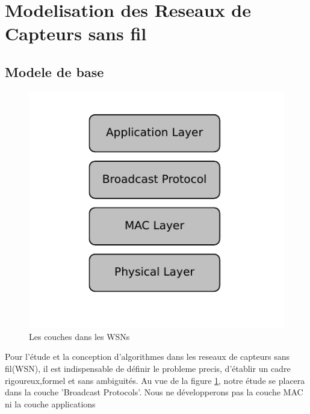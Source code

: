 
\pagestyle{plain} 	%

\setcounter{tocdepth}{4}     %


\section{Modelisation des Reseaux de Capteurs sans fil}

\subsection{Modele de base}

\begin{figure}[h]
\centering
\includegraphics[scale=0.9]{source/layer.pdf}
\caption{\label{Layer} Les couches dans les WSNs}
\end{figure}

Pour l'étude et la conception d'algorithmes dans les reseaux de capteurs sans fil(WSN), il est indispensable de définir le probleme precis, d'établir un cadre rigoureux,formel et sans ambiguités. Au vue de la figure \ref{Layer}, notre étude se 
placera dans la couche 'Broadcast Protocols'. Nous ne développerons pas la couche MAC ni la couche applications\\


